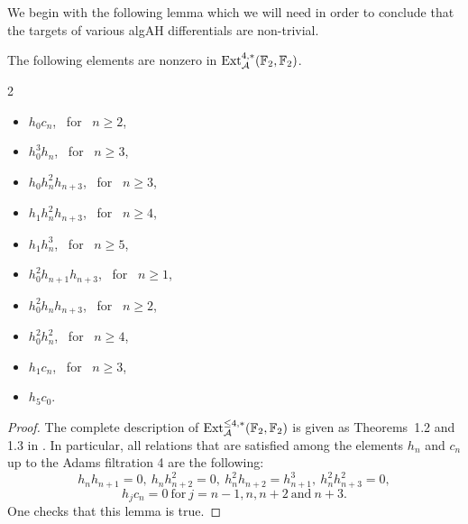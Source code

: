 We begin with the following lemma which we will need in order to conclude that the targets of various algAH differentials are non-trivial.

\begin{lem} \label{fact on Ext4}
The following elements are nonzero in $\operatorname{\mathrm{Ext}}_{\operatorname{\mathcal{A}}}^{4,*}(\operatorname{\mathbb{F}}_2, \operatorname{\mathbb{F}}_2)$.
\begin{multicols}{2}
\begin{itemize}
\item $h_0c_n$, \ for \ $n \geq 2$,
\item $h_0^3 h_n$, \ for \ $n \geq 3$,
\item $h_0h_n^2h_{n+3}$, \ for \ $n \geq 3$,
\item $h_1h_n^2h_{n+3}$, \ for \ $n \geq 4$,
\item $h_1h_n^3$, \ for \ $n \geq 5$,
\item $h_0^2h_{n+1}h_{n+3}$, \ for \ $n \geq 1$,
\item $h_0^2h_nh_{n+3}$, \ for \ $n \geq 2$,
\item $h_0^2 h_n^2$, \ for \ $n \geq 4$,
\item $h_1c_n$, \ for \ $n \geq 3$,
\item $h_5c_0$.
\end{itemize}
\end{multicols}
\end{lem}

\begin{proof}
The complete description of $\operatorname{\mathrm{Ext}}_{\operatorname{\mathcal{A}}}^{\leq 4,*}(\operatorname{\mathbb{F}}_2, \operatorname{\mathbb{F}}_2)$ is given as Theorems~1.2 and 1.3 in \cite{LinExt}. In particular, all relations that are satisfied among the elements $h_n$ and $c_n$ up to the Adams filtration 4 are the following:
$$h_nh_{n+1} = 0, \ h_n h_{n+2}^2 = 0, \ h_n^2 h_{n+2} = h_{n+1}^3, \ h_n^2 h_{n+3}^2 = 0,$$
$$h_j c_n = 0 \ \text{for} \ j = n-1, n, n+2 \ \text{and} \ n+3.$$
One checks that this lemma is true.
\end{proof}


